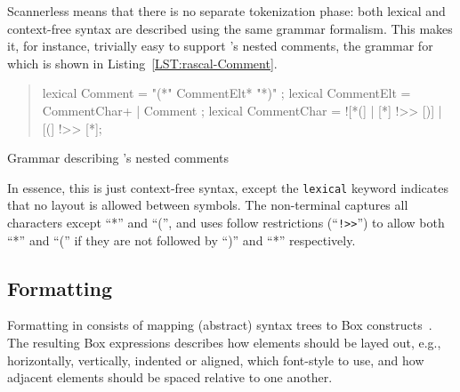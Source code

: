 Scannerless means that there is no separate tokenization phase: both
lexical and context-free syntax are described using the same grammar
formalism. This makes it, for instance, trivially easy to support
\oberon's nested comments, the grammar for which is shown in Listing~\ref{LST:rascal-Comment}.
\begin{listing}
\begin{quote}
\begin{rascal}
lexical Comment = "(*" CommentElt* "*)" ;
lexical CommentElt = CommentChar+ | Comment ;
lexical CommentChar = ![*(] | [*] !>> [)] | [(] !>> [*];
\end{rascal}
\end{quote}
\caption{Grammar describing \oberon's nested comments}
\label{LST:rascal-Comment}
\end{listing}
In essence, this is just context-free syntax, except the
\texttt{lexical} keyword indicates that no layout is allowed between
symbols. The  non-terminal captures all characters except
``*'' and ``('', and uses follow restrictions (``\texttt{!>>}'') to
allow both ``*'' and ``('' if they are not followed by ``)'' and ``*''
respectively.

\subsection{Formatting}

\noindent Formatting in \Rascal consists of mapping (abstract) syntax
trees to Box constructs~\cite{BV96}. The resulting Box expressions
describes how elements should be layed out, e.g., horizontally,
vertically, indented or aligned, which font-style to use, and how
adjacent elements should be spaced relative to one another.

